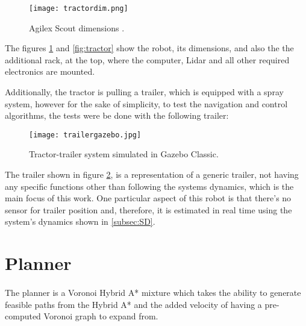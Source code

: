  
\begin{figure}[h]
    \centering
    \texttt{[image: tractordim.png]}
    \caption{Agilex Scout dimensions \cite{scoutdim}.}
    \label{fig:tractordim}
\end{figure}

The figures \ref{fig:tractordim} and \ref{fig:tractor} show the robot, its dimensions, and also the 
the additional rack, at the top, where the computer, Lidar and all other required electronics 
are mounted.

Additionally, the tractor is pulling a trailer, which is equipped with 
a spray system, however for the sake of simplicity, to test the navigation 
and control algorithms, the tests were be done with the following trailer:
\clearpage
\begin{figure}[h]
    \centering
    \texttt{[image: trailergazebo.jpg]}
    \caption{Tractor-trailer system simulated in Gazebo Classic.}
    \label{fig:trailergazebo}
\end{figure}

The trailer shown in figure \ref{fig:trailergazebo}, is a representation of a generic trailer, not having any specific 
functions other than following the systems dynamics, which is the main focus of this work. 
One particular aspect of this robot is that there's no sensor for 
trailer position and, therefore, it is estimated in real time using the 
system's dynamics shown in \ref{subsec:SD}.
\section{Planner}
\label{sec:planner1}
\paragraph{}The planner is a Voronoi Hybrid A* mixture which takes the 
ability to generate feasible paths from the Hybrid A* and the 
added velocity of having a pre-computed Voronoi graph to expand 
from.


